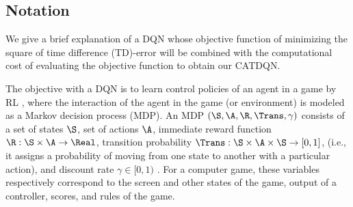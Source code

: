\subsection{Notation}
We give a brief explanation of a DQN \citep{mnih2015human} whose 
objective function of minimizing the square of time difference (TD)-error will be 
combined with the computational cost of evaluating the objective 
function to obtain our CATDQN. 

The objective with a DQN is to learn control policies of an agent in a 
game by RL \citep{sutton1998reinforcement}, where the interaction of 
the agent in the game (or environment) is modeled as a Markov decision 
process (MDP). An MDP $(\S, \A, \R, \Trans, \gamma)$ consists of a set of 
states $\S$, set of actions $\A$, immediate reward function $\R: 
\S\times\A \rightarrow \Real$, transition probability $\Trans: \S 
\times \A \times \S \rightarrow [0,1]$, (i.e., it assigns a 
probability of moving from one state to another with a particular 
action), and discount rate $\gamma \in [0, 1)$ . 
For a computer game, these variables respectively correspond 
to the screen and other states of the game, output of a controller, 
scores, and rules of the game.

